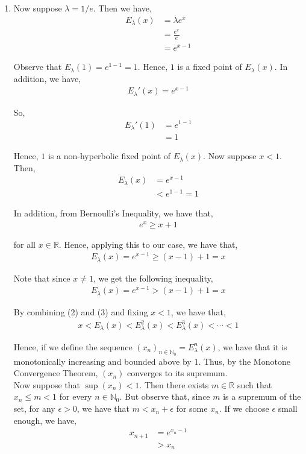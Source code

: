 \documentclass[12pt]{article}
\begin{document}
\begin{enumerate}[label=(\alph*)]
\item Now suppose $\lambda = 1/e$. Then we have,
\begin{align*}
E_{\lambda}(x) &= \lambda e^x\\
&=\frac{e^x}{e}\\
&= e^{x-1}
\end{align*}

Observe that $E_{\lambda}(1) = e^{1-1} = 1$. Hence, $1$ is a fixed point of $E_{\lambda}(x)$. In addition, we have,
\begin{align*}
E_{\lambda}'(x) = e^{x-1}
\end{align*}

So,
\begin{align*}
E_{\lambda}'(1) &= e^{1-1}\\
&= 1
\end{align*}

Hence, $1$ is a non-hyperbolic fixed point of $E_{\lambda}(x)$. Now suppose $x < 1$. Then,
\begin{align}
E_{\lambda}(x) &= e^{x-1} \nonumber \\
&< e^{1-1} = 1
\end{align}

In addition, from Bernoulli's Inequality, we have that,
\begin{align*}
e^x \geq x+1
\end{align*}

for all $x \in \mathbb{R}$. Hence, applying this to our case, we have that,
\begin{align*}
E_{\lambda}(x) = e^{x-1} \geq (x-1)+1 = x
\end{align*}

Note that since $x \neq 1$, we get the following inequality,
\begin{align}
E_{\lambda}(x) = e^{x-1} > (x-1)+1 = x
\end{align}

By combining (2) and (3) and fixing $x < 1$, we have that,
\begin{align*}
x < E_{\lambda}(x) < E_{\lambda}^2(x) < E_{\lambda}^3(x) < \cdots < 1
\end{align*}

Hence, if we define the sequence $(x_n)_{n \in \mathbb{N}_0} = E_{\lambda}^n(x)$, we have that it is monotonically increasing and bounded above by $1$. Thus, by the Monotone Convergence Theorem, $(x_n)$ converges to its supremum.\\

Now suppose that $\sup (x_n) < 1$. Then there exists $m \in \mathbb{R}$ such that $x_n \leq m < 1$ for every $n \in \mathbb{N}_0$. But observe that, since $m$ is a supremum of the set, for any $\epsilon > 0$, we have that $m < x_n + \epsilon$ for some $x_n$. If we choose $\epsilon$ small enough, we have,
\begin{align*}
x_{n+1} &= e^{x_n - 1}\\
&> x_n
\end{align*}


\end{enumerate}
\end{document}
